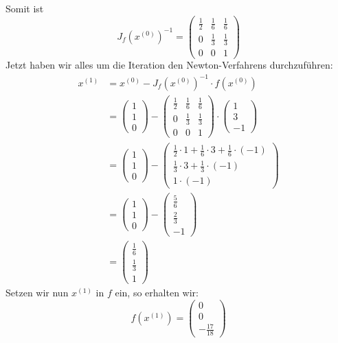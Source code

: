 Somit ist 
$$
J_f(x^{(0)})^{-1}=\begin{pmatrix} \frac{1}{2}&\frac{1}{6}&\frac{1}{6}\\
			0&\frac{1}{3}&\frac{1}{3}\\
			0&0&1 \end{pmatrix}
$$
Jetzt haben wir alles um die Iteration den Newton-Verfahrens durchzuführen:
\begin{align*}
x^{(1)}&=x^{(0)} - J_f(x^{(0)})^{-1}\cdot f(x^{(0)})\\
&=\begin{pmatrix} 1\\1\\0 \end{pmatrix} - \begin{pmatrix} \frac{1}{2}&\frac{1}{6}&\frac{1}{6}\\0&\frac{1}{3}&\frac{1}{3}\\ 0&0&1 \end{pmatrix} \cdot \begin{pmatrix} 1\\3\\-1 \end{pmatrix}\\
&=\begin{pmatrix} 1\\1\\0 \end{pmatrix} -\begin{pmatrix} \frac{1}{2}\cdot 1 + \frac{1}{6}\cdot 3 + \frac{1}{6}\cdot (-1) \\ \frac{1}{3}\cdot 3 + \frac{1}{3}\cdot (-1)\\ 1 \cdot (-1) \end{pmatrix}\\
&=\begin{pmatrix} 1\\1\\0 \end{pmatrix} -\begin{pmatrix} \frac{5}{6}\\ \frac{2}{3}\\ -1 \end{pmatrix}\\
&=\begin{pmatrix} \frac{1}{6}\\\frac{1}{3}\\1 \end{pmatrix}
\end{align*}
Setzen wir nun $x^{(1)}$ in $f$ ein, so erhalten wir:
$$
f(x^{(1)})=\begin{pmatrix} 0\\0\\-\frac{17}{18} \end{pmatrix}
$$
